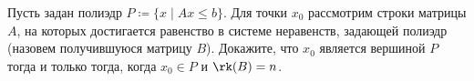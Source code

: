 Пусть задан полиэдр $P \coloneqq \{x \mid Ax \le b\}$. Для точки $x_0$ рассмотрим строки матрицы $A$, на
которых достигается равенство в системе неравенств, задающей полиэдр (назовем получившуюся матрицу
$B$). Докажите, что $x_0$ является вершиной $P$ тогда и только тогда, когда $x_0 \in P$ и
$\rk(B) = n$.